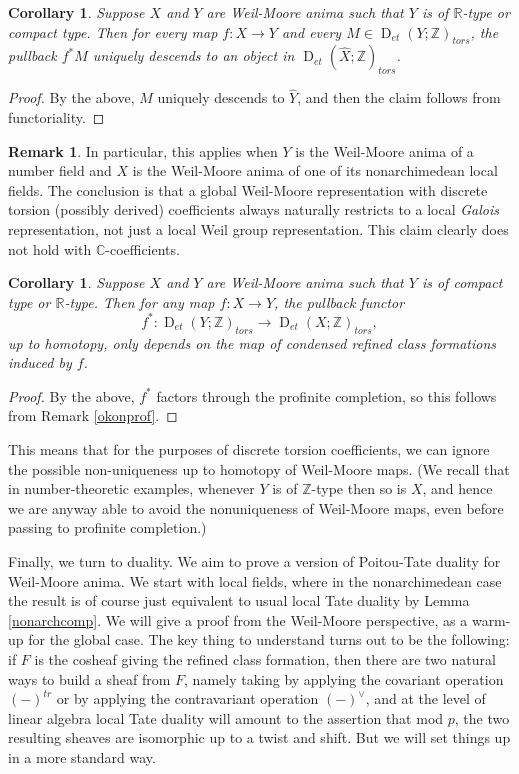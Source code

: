 \documentclass[12pt]{article}
\newtheorem{corollary}[theorem]{Corollary}
\theoremstyle{definition}
\newtheorem{remark}[theorem]{Remark}
\newcommand{\on}{\operatorname}
\newcommand{\mbb}{\mathbb}
\newcommand{\wh}{\widehat}
\begin{document}
\begin{corollary}
Suppose $X$ and $Y$ are Weil-Moore anima such that $Y$ is of $\mbb{R}$-type or compact type.  Then for every map $f:X\to Y$ and every $M\in\on{D}_{et}(Y;\mbb{Z})_{tors}$, the pullback $f^\ast M$ uniquely descends to an object in $\on{D}_{et}(\wh{X};\mbb{Z})_{tors}$.
\end{corollary}
\begin{proof}
By the above, $M$ uniquely descends to $\wh{Y}$, and then the claim follows from functoriality.
\end{proof}

\begin{remark}\label{globaldescends}
In particular, this applies when $Y$ is the Weil-Moore anima of a number field and $X$ is the Weil-Moore anima of one of its nonarchimedean local fields.  The conclusion is that a global Weil-Moore representation with discrete torsion (possibly derived) coefficients always naturally restricts to a local \emph{Galois} representation, not just a local Weil group representation.  This claim clearly does not hold with $\mbb{C}$-coefficients.
\end{remark}

\begin{corollary}
Suppose $X$ and $Y$ are Weil-Moore anima such that $Y$ is of compact type or $\mbb{R}$-type.  Then for any map $f:X\to Y$, the pullback functor
$$f^\ast:\on{D}_{et}(Y;\mbb{Z})_{tors} \to \on{D}_{et}(X;\mbb{Z})_{tors},$$
up to homotopy, only depends on the map of condensed refined class formations induced by $f$.
\end{corollary}
\begin{proof}
By the above, $f^\ast$ factors through the profinite completion, so this follows from Remark \ref{okonprof}.
\end{proof}

This means that for the purposes of discrete torsion coefficients, we can ignore the possible non-uniqueness up to homotopy of Weil-Moore maps.  (We recall that in number-theoretic examples, whenever $Y$ is of $\mbb{Z}$-type then so is $X$, and hence we are anyway able to avoid the nonuniqueness of Weil-Moore maps, even before passing to profinite completion.)



Finally, we turn to duality.  We aim to prove a version of Poitou-Tate duality for Weil-Moore anima.  We start with local fields, where in the nonarchimedean case the result is of course just equivalent to usual local Tate duality by Lemma \ref{nonarchcomp}.  We will give a proof from the Weil-Moore perspective, as a warm-up for the global case.  The key thing to understand turns out to be the following: if $F$ is the cosheaf giving the refined class formation, then there are two natural ways to build a sheaf from $F$, namely taking by applying the covariant operation $(-)^{tr}$ or by applying the contravariant operation $(-)^\vee$, and at the level of linear algebra local Tate duality will amount to the assertion that mod $p$, the two resulting sheaves are isomorphic up to a twist and shift.  But we will set things up in a more standard way.
\end{document}
